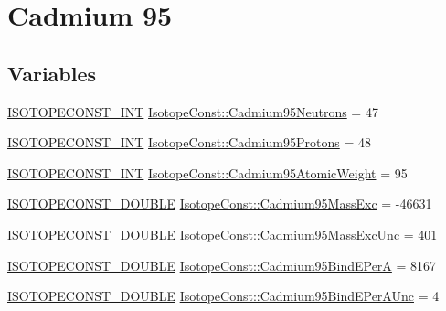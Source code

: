 \hypertarget{group___isotope_const-_cadmium-_cd95}{}\section{Cadmium 95}
\label{group___isotope_const-_cadmium-_cd95}
\subsection*{Variables}
\begin{DoxyCompactItemize}
\item 
\mbox{\hyperlink{group___isotope_const-_macros_ga5f18360b3e99483a35c32d789e62621c}{I\+S\+O\+T\+O\+P\+E\+C\+O\+N\+S\+T\+\_\+\+I\+NT}} \mbox{\hyperlink{group___isotope_const-_cadmium-_cd95_gaa80abdaad1dc1c0892c3b7818e0ebd07}{Isotope\+Const\+::\+Cadmium95\+Neutrons}} = 47
\item 
\mbox{\hyperlink{group___isotope_const-_macros_ga5f18360b3e99483a35c32d789e62621c}{I\+S\+O\+T\+O\+P\+E\+C\+O\+N\+S\+T\+\_\+\+I\+NT}} \mbox{\hyperlink{group___isotope_const-_cadmium-_cd95_ga6ec4ba617025919f14e51996853e02db}{Isotope\+Const\+::\+Cadmium95\+Protons}} = 48
\item 
\mbox{\hyperlink{group___isotope_const-_macros_ga5f18360b3e99483a35c32d789e62621c}{I\+S\+O\+T\+O\+P\+E\+C\+O\+N\+S\+T\+\_\+\+I\+NT}} \mbox{\hyperlink{group___isotope_const-_cadmium-_cd95_gacc6c3d015ae2664890709d634a5e9762}{Isotope\+Const\+::\+Cadmium95\+Atomic\+Weight}} = 95
\item 
\mbox{\hyperlink{group___isotope_const-_macros_ga8f45a7272ce02c0b4c65c44636ed719a}{I\+S\+O\+T\+O\+P\+E\+C\+O\+N\+S\+T\+\_\+\+D\+O\+U\+B\+LE}} \mbox{\hyperlink{group___isotope_const-_cadmium-_cd95_ga1c54f53c918f52c76cfcd6c6e542ae41}{Isotope\+Const\+::\+Cadmium95\+Mass\+Exc}} = -\/46631
\item 
\mbox{\hyperlink{group___isotope_const-_macros_ga8f45a7272ce02c0b4c65c44636ed719a}{I\+S\+O\+T\+O\+P\+E\+C\+O\+N\+S\+T\+\_\+\+D\+O\+U\+B\+LE}} \mbox{\hyperlink{group___isotope_const-_cadmium-_cd95_ga74e3f054f425698a877e03bc70b68c4b}{Isotope\+Const\+::\+Cadmium95\+Mass\+Exc\+Unc}} = 401
\item 
\mbox{\hyperlink{group___isotope_const-_macros_ga8f45a7272ce02c0b4c65c44636ed719a}{I\+S\+O\+T\+O\+P\+E\+C\+O\+N\+S\+T\+\_\+\+D\+O\+U\+B\+LE}} \mbox{\hyperlink{group___isotope_const-_cadmium-_cd95_gad5c65971b4345de266a01b3f4d470b8b}{Isotope\+Const\+::\+Cadmium95\+Bind\+E\+PerA}} = 8167
\item 
\mbox{\hyperlink{group___isotope_const-_macros_ga8f45a7272ce02c0b4c65c44636ed719a}{I\+S\+O\+T\+O\+P\+E\+C\+O\+N\+S\+T\+\_\+\+D\+O\+U\+B\+LE}} \mbox{\hyperlink{group___isotope_const-_cadmium-_cd95_ga51605aea8c5dd73638a9cb4daf0cf198}{Isotope\+Const\+::\+Cadmium95\+Bind\+E\+Per\+A\+Unc}} = 4

\end{DoxyCompactItemize}
